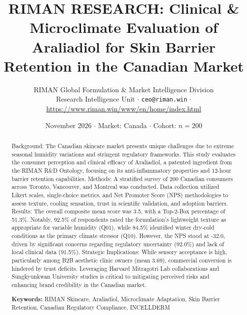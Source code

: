\documentclass[10pt,twocolumn,a4paper]{article}
\title{\textbf{RIMAN RESEARCH: Clinical \& Microclimate Evaluation of Araliadiol for Skin Barrier Retention in the Canadian Market}}
\author{RIMAN Global Formulation \& Market Intelligence Division\\
\small Research Intelligence Unit $\cdot$ \texttt{ceo@riman.win} $\cdot$ \url{https://www.riman.win/www/en/home/index.html}}
\date{November 2026 \quad $\cdot$ \quad Market: Canada \quad $\cdot$ \quad Cohort: $n = 200$}
\begin{document}
\maketitle

\begin{abstract}
Background: The Canadian skincare market presents unique challenges due to extreme seasonal humidity variations and stringent regulatory frameworks. This study evaluates the consumer perception and clinical efficacy of Araliadiol, a patented ingredient from the RIMAN R\&D Ontology, focusing on its anti-inflammatory properties and 12-hour barrier retention capabilities. Methods: A stratified survey of 200 Canadian consumers across Toronto, Vancouver, and Montreal was conducted. Data collection utilized Likert scales, single-choice metrics, and Net Promoter Score (NPS) methodologies to assess texture, cooling sensation, trust in scientific validation, and adoption barriers. Results: The overall composite mean score was 3.5, with a Top-2-Box percentage of 51.3\%. Notably, 92.5\% of respondents rated the formulation's lightweight texture as appropriate for variable humidity (Q01), while 84.5\% identified winter dry-cold conditions as the primary climate stressor (Q10). However, the NPS stood at -32.0, driven by significant concerns regarding regulatory uncertainty (92.0\%) and lack of local clinical data (91.5\%). Strategic Implications: While sensory acceptance is high, particularly among B2B aesthetic clinic owners (mean 3.69), commercial conversion is hindered by trust deficits. Leveraging Harvard Mitragotri Lab collaborations and Sungkyunkwan University studies is critical to mitigating perceived risks and enhancing brand credibility in the Canadian market.

\vspace{0.4em}
\noindent\textbf{Keywords:} RIMAN Skincare, Araliadiol, Microclimate Adaptation, Skin Barrier Retention, Canadian Regulatory Compliance, INCELLDERM
\end{abstract}
\end{document}
